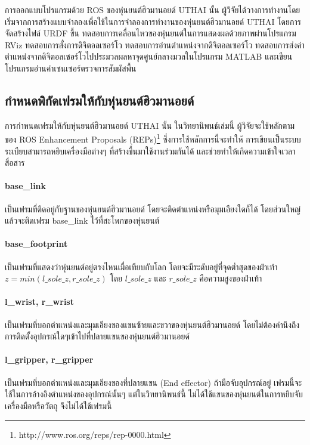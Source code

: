 การออกแบบโปรแกรมด้วย ROS ของหุ่นยนต์ฮิวมานอยด์ UTHAI นั้น
ผู้วิจัยได้วางการทำงานโดย เริ่มจากการสร้างแบบจำลองเพื่อใช้ในการจำลองการทำงานของหุ่นยนต์ฮิวมานอยด์ UTHAI
โดยการจัดสร้างไฟล์ URDF ขึ้น ทดสอบการเคลื่อนไหวของหุ่นยนต์ในการแสดงผลด้วยภาพผ่านโปรแกรม RViz
ทดสอบการสั่งการดิจิตอลเซอร์โว ทดสอบการอ่านตำแหน่งจากดิจิตอลเซอร์โว
ทดสอบการส่งค่าตำแหน่งจากดิจิตอลเซอร์โวไปประมวลผลหาจุดศูนย์กลางมวลในโปรแกรม MATLAB
และเขียนโปรแกรมอ่านค่าเซนเซอร์ตรวจการสัมผัสพื้น

\vspace{20pt}
\subsection{กำหนดพิกัดเฟรมให้กับหุ่นยนต์ฮิวมานอยด์}
การกำหนดเฟรมให้กับหุ่นยนต์ฮิวมานอยด์ UTHAI นั้น ในวิทยานิพนธ์เล่มนี้ ผู้วิจัยจะใช้หลักตามของ
ROS Enhancement Proposals (REPs)\footnote{http://www.ros.org/reps/rep-0000.html}
ซึ่งการใช้หลักการนี้จะทำให้ การเขียนเป็นระบบระเบียบสามารถหยิบเครื่องมือต่างๆ
ที่สร้างขึ้นมาใช้งานร่วมกันได้ และช่วยทำให้เกิดความเข้าใจเวลาสื่อสาร

\paragraph*{base\_link}
เป็นเฟรมที่ติดอยู่กับฐานของหุ่นยนต์ฮิวมานอยด์ โดยจะติดตำแหน่งหรือมุมเอียงใดก็ได้
โดยส่วนใหญ่แล้วจะติดเฟรม base\_link ไว้ที่สะโพกของหุ่นยนต์

\paragraph*{base\_footprint}
เป็นเฟรมที่แสดงว่าหุ่นยนต์อยู่ตรงไหนเมื่อเทียบกับโลก โดยจะมีระดับอยู่ที่จุดต่ำสุดของฝ่าเท้า $z = min(l\_sole\_z,r\_sole\_z)$
โดย $l\_sole\_z$ และ $r\_sole\_z$ คือความสูงของฝ่าเท้า

\paragraph*{l\_wrist, r\_wrist}
เป็นเฟรมที่บอกตำแหน่งและมุมเอียงของแขนซ้ายและขวาของหุ่นยนต์ฮิวมานอยด์ โดยไม่ต้องคำนึงถึงการติดตั้งอุปกรณ์ใดๆเข้าไปที่ปลายแขนของหุ่นยนต์ฮิวมานอยด์

\paragraph*{l\_gripper, r\_gripper}
เป็นเฟรมที่บอกตำแหน่งและมุมเอียงของที่ปลายแขน (End effector) ถ้ามือจับอุปกรณ์อยู่ เฟรมนี้จะใช้ในการอ้างอิงตำแหน่งของอุปกรณ์นั้นๆ
แต่ในวิทยานิพนธ์นี้ ไม่ได้ใช้แขนของหุ่นยนต์ในการหยิบจับเครื่องมือหรือวัตถุ จึงไม่ได้ใช้เฟรมนี้

